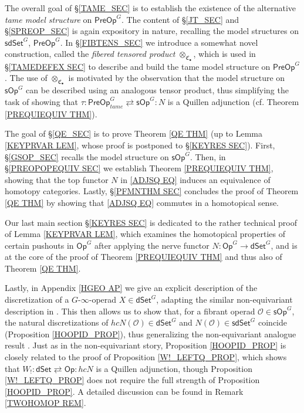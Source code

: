 \documentclass[a4paper,10pt
,draft
]{article}%
\numberwithin{equation}{section}
\numberwithin{figure}{section}
\theoremstyle{definition} %
\renewcommand{\O}{\ensuremath{\mathcal O}}
\newcommand{\1}{\ensuremath{\mathbbm 1}}%
\begin{document}
The overall goal of \S \ref{TAME_SEC}
is to establish the existence of the alternative
\emph{tame model structure} on $\mathsf{PreOp}^G$.
The content of \S \ref{JT_SEC} and \S \ref{SPREOP_SEC}
is again expository in nature, 
recalling the model structures on 
$\mathsf{sdSet}^G$, 
$\mathsf{PreOp}^G$.
In \S \ref{FIBTENS_SEC}
we introduce a somewhat novel construction,
called the \emph{fibered tensored product}
$\otimes_{\mathfrak{C}_{\bullet}}$,
which is used in 
\S \ref{TAMEDEFEX SEC}
to describe and build the tame model structure on 
$\mathsf{PreOp}^G$.
%
The use of $\otimes_{\mathfrak{C}_{\bullet}}$
is motivated by the observation that the
model structure on $\mathsf{sOp}^G$
can be described using an analogous tensor product,
thus simplifying the task of showing that  
$\tau \colon \mathsf{PreOp}^G_{tame}
\rightleftarrows
\mathsf{sOp}^G \colon N$
is a Quillen adjunction
(cf. Theorem \ref{PREQUIEQUIV THM}).



The goal of \S \ref{QE_SEC} is to prove 
Theorem \ref{QE THM}
(up to Lemma \ref{KEYPRVAR LEM},
whose proof is postponed to \S \ref{KEYRES SEC}).
First,
\S \ref{GSOP_SEC} recalls the model structure on
$\mathsf{sOp}^G$.
Then, in 
\S \ref{PREOPOPEQUIV SEC}
we establish Theorem \ref{PREQUIEQUIV THM},
showing that the top functor $N$ in 
\eqref{ADJSQ EQ}
induces an equivalence of homotopy categories.
Lastly, \S \ref{PFMNTHM SEC}
concludes the proof of Theorem \ref{QE THM}
by showing that
\eqref{ADJSQ EQ}
commutes in a homotopical sense.


Our last main section \S \ref{KEYRES SEC}
is dedicated to the rather technical proof of 
Lemma \ref{KEYPRVAR LEM},
which examines the homotopical properties
of certain pushouts in 
$\mathsf{Op}^G$
after applying the nerve functor
$N \colon \mathsf{Op}^G \to \mathsf{dSet}^G$,
and is at the core of the proof of 
Theorem \ref{PREQUIEQUIV THM}
and thus also of Theorem \ref{QE THM}.


Lastly, in Appendix \ref{HGEO AP}
we give an explicit description of the discretization of
a $G$-$\infty$-operad $X \in \mathsf{dSet}^G$,
adapting the similar non-equivariant description
in \cite[\S 6]{MW09}.
This then allows us to
show that,
for a fibrant operad
$\O \in \mathsf{sOp}^G$,
the natural discretizations of
$hcN(\O) \in \mathsf{dSet}^G$
and
$N(\O) \in \mathsf{sdSet}^G$
coincide (Proposition \ref{HOOPID_PROP}),
thus generalizing the non-equivariant analogue result
\cite[Prop. 4.8]{CM13b}.
Just as in the non-equivariant story,
Proposition \ref{HOOPID_PROP} is closely related
to the proof of 
Proposition \ref{W!_LEFTQ_PROP},
which shows that 
$W_! 
\colon 
\mathsf{dSet} 
\rightleftarrows 
\mathsf{Op}
\colon 
hcN$
is a Quillen adjunction,
though Proposition \ref{W!_LEFTQ_PROP}
does not require the full strength of 
Proposition \ref{HOOPID_PROP}.
A detailed discussion can be found in 
Remark \ref{TWOHOMOP REM}.
\end{document}
